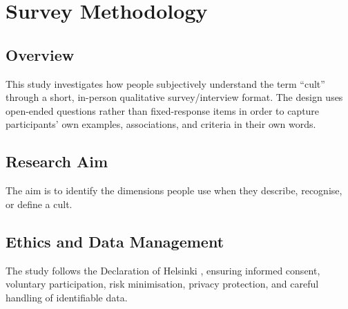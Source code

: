 \chapter{Survey Methodology}\label{ch:survey_methodology}

\section{Overview}
This study investigates how people subjectively understand the term \enquote{cult} through a short, in-person qualitative survey/interview format. The design uses open-ended questions rather than fixed-response items in order to capture participants' own examples, associations, and criteria in their own words.

\section{Research Aim}
The aim is to identify the dimensions people use when they describe, recognise, or define a cult.

\section{Ethics and Data Management}
The study follows the Declaration of Helsinki \parencite{wmaDeclarationHelsinki2013}, ensuring informed consent, voluntary participation, risk minimisation, privacy protection, and careful handling of identifiable data.

